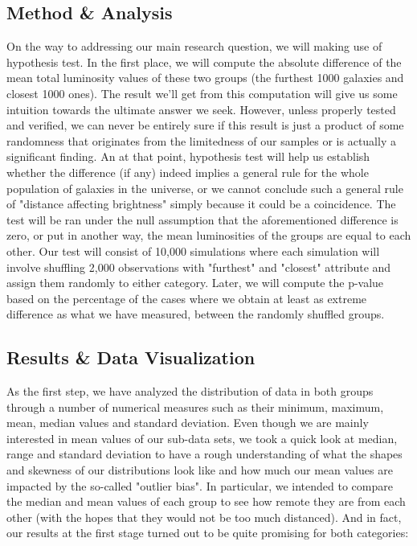 \documentclass[12pt]{article}
\begin{document}
\subsection{Method \& Analysis}

On the way to addressing our main research question, we will making use of hypothesis test. In the first place, we will compute the absolute difference of the mean total luminosity values of these two groups (the furthest 1000 galaxies and closest 1000 ones). The result we'll get from this computation will give us some intuition towards the ultimate answer we seek. However, unless properly tested and verified, we can never be entirely sure if this result is just a product of some randomness that originates from the limitedness of our samples or is actually a significant finding. An at that point, hypothesis test will help us establish whether the difference (if any) indeed implies a general rule for the whole population of galaxies in the universe, or we cannot conclude such a general rule of "distance affecting brightness" simply because it could be a coincidence. The test will be ran under the null assumption that the aforementioned difference is zero, or put in another way, the mean luminosities of the groups are equal to each other. Our test will consist of 10,000 simulations where each simulation will involve shuffling 2,000 observations with "furthest" and "closest" attribute and assign them randomly to either category. Later, we will compute the p-value based on the percentage of the cases where we obtain at least as extreme difference as what we have measured, between the randomly shuffled groups.

\subsection{Results \& Data Visualization}

As the first step, we have analyzed the distribution of data in both groups through a number of numerical measures such as their minimum, maximum, mean, median values and standard deviation. Even though we are mainly interested in mean values of our sub-data sets, we took a quick look at median, range and standard deviation to have a rough understanding of what the shapes and skewness of our distributions look like and how much our mean values are impacted by the so-called "outlier bias". In particular, we intended to compare the median and mean values of each group to see how remote they are from each other (with the hopes that they would not be too much distanced). And in fact, our results at the first stage turned out to be quite promising for both categories:
\end{document}
